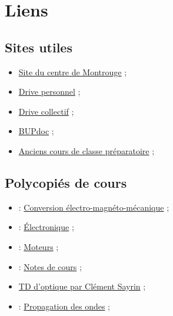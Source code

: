 \chapter*{Liens}

\section*{Sites utiles}

\begin{itemize}
\item \href{http://ressources.agreg.phys.ens.fr/index}{Site du centre de Montrouge} ;
\item \href{https://drive.google.com/drive/folders/1k25PmoJLoWdJqkvU63OvsjhtP5SWEFPo?usp=sharing}{Drive personnel} ;
\item \href{https://drive.google.com/drive/folders/1Xz8t7SrdGd-0hLLhcAqeeyTuv98uMSQ1?usp=sharing}{Drive collectif} ;
\item \href{http://bupdoc.udppc.asso.fr/consultation/selections.php}{BUPdoc} ;
\item \href{http://www.joelsornette.fr/}{Anciens cours de classe préparatoire} ;
\end{itemize}

\section*{Polycopiés de cours}

\begin{itemize}
\item \cite{Naval} : \href{https://lnspe2.fr/Cours_Phys/CP02.pdf}{Conversion électro-magnéto-mécanique} ;
\item \cite{Neveu2019a} : \href{https://gitlab.in2p3.fr/Jeremy/Electronique}{Électronique} ;
\item \cite{Neveu2019} : \href{https://gitlab.in2p3.fr/Jeremy/Moteurs}{Moteurs} ;
\item \cite{Rabaud2019} : \href{http://www.fast.u-psud.fr/~rabaud/}{Notes de cours} ;
\item \href{http://www.lkb.upmc.fr/cqed/teaching/teachingsayrin/}{TD d'optique par Clément Sayrin} ;
\item \cite{Thibierge2014} : \href{https://www.etienne-thibierge.fr/agreg/ondes_poly_2015.pdf}{Propagation des ondes} ;
\end{itemize}


